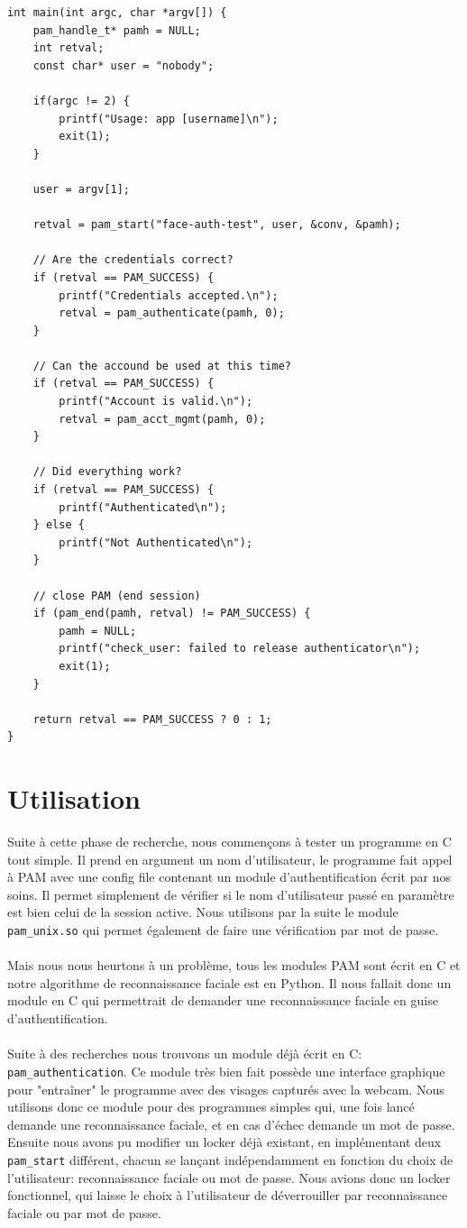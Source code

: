 \documentclass{article}
\begin{document}
\begin{itemize}
\begin{verbatim}
int main(int argc, char *argv[]) {
	pam_handle_t* pamh = NULL;
	int retval;
	const char* user = "nobody";

	if(argc != 2) {
		printf("Usage: app [username]\n");
		exit(1);
	}

	user = argv[1];

	retval = pam_start("face-auth-test", user, &conv, &pamh);

	// Are the credentials correct?
	if (retval == PAM_SUCCESS) {
		printf("Credentials accepted.\n");
		retval = pam_authenticate(pamh, 0);
	}

	// Can the accound be used at this time?
	if (retval == PAM_SUCCESS) {
		printf("Account is valid.\n");
		retval = pam_acct_mgmt(pamh, 0);
	}

	// Did everything work?
	if (retval == PAM_SUCCESS) {
		printf("Authenticated\n");
	} else {
		printf("Not Authenticated\n");
	}

	// close PAM (end session)
	if (pam_end(pamh, retval) != PAM_SUCCESS) {
		pamh = NULL;
		printf("check_user: failed to release authenticator\n");
		exit(1);
	}

	return retval == PAM_SUCCESS ? 0 : 1;
}
    \end{verbatim}
  \end{itemize}

  \section{Utilisation}

  Suite à cette phase de recherche, nous commençons à tester un programme en C
  tout simple. Il prend en argument un nom d’utilisateur, le programme fait
  appel à PAM avec une config file contenant un module d’authentification écrit
  par nos soins. Il permet simplement de vérifier si le nom d’utilisateur passé
  en paramètre est bien celui de la session active. Nous utilisons par la suite
  le module \texttt{pam\_unix.so} qui permet également de faire une
  vérification par mot de passe.
\\ \\
  Mais nous nous heurtons à un problème, tous les modules PAM sont écrit en C
  et notre algorithme de reconnaissance faciale est en Python. Il nous fallait
  donc un module en C qui permettrait de demander une reconnaissance faciale en
  guise d’authentification.
\\ \\
  Suite à des recherches nous trouvons un module déjà écrit en C:
  \texttt{pam\_authentication}. Ce module très bien fait possède une interface
  graphique pour "entraîner" le programme avec des visages capturés avec la webcam. Nous
  utilisons donc ce module pour des programmes simples qui, une fois lancé
  demande une reconnaissance faciale, et en cas d’échec demande un mot de
  passe. Ensuite nous avons pu modifier un locker déjà existant, en
  implémentant deux \texttt{pam\_start} différent, chacun se lançant
  indépendamment en fonction du choix de l’utilisateur: reconnaissance faciale
  ou mot de passe. Nous avions donc un locker fonctionnel, qui laisse le choix à
  l’utilisateur de déverrouiller par reconnaissance faciale ou par mot de
  passe.
\end{document}
